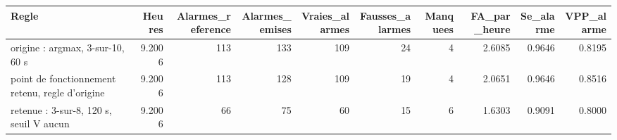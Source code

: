 \begin{tabular}{lrrrrrrrrr}
\toprule
Regle & Heures & Alarmes_reference & Alarmes_emises & Vraies_alarmes & Fausses_alarmes & Manquees & FA_par_heure & Se_alarme & VPP_alarme \\
\midrule
origine : argmax, 3-sur-10, 60 s & 9.2006 & 113 & 133 & 109 & 24 & 4 & 2.6085 & 0.9646 & 0.8195 \\
point de fonctionnement retenu, regle d'origine & 9.2006 & 113 & 128 & 109 & 19 & 4 & 2.0651 & 0.9646 & 0.8516 \\
retenue : 3-sur-8, 120 s, seuil V aucun & 9.2006 & 66 & 75 & 60 & 15 & 6 & 1.6303 & 0.9091 & 0.8000 \\
\bottomrule
\end{tabular}
